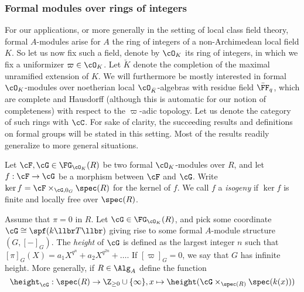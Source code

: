 \documentclass[../main.tex]{subfiles}
\begin{document}

\subsubsection{Formal modules over rings of integers} %
\label{ssub:Formal modules over rings of integers}
For our applications, or more generally in the setting of local class field theory,
formal $A$-modules arise for $A$ the ring of integers of a
non-Archimedean local field $K$. So let us now fix such a field, denote by
$\cO_K$ its ring of integers, in which we fix a uniformizer $\varpi \in \cO_K$. 
Let $\breve K$ denote the completion of the maximal unramified extension of $K$.
We will furthermore be mostly interested in formal $\cO_K$-modules over noetherian local
$\cO_{\breve K}$-algebras with residue field $\bar \FF_q$, which are complete
and Hausdorff (although this is automatic for our notion of completeness) with
respect to the $\varpi$-adic topology. Let us denote the category of such rings
with $\cC$. For sake of clarity, the succeeding results and definitions on
formal groups will be stated in this setting. Most of the results readily
generalize to more general situations.


\begin{defi}[Isogenies]
    Let $\cF, \cG \in \FG_{\cO_K}(R)$ be two formal $\cO_K$-modules over $R$, and 
    let $f: \cF \to \cG$ be a morphism between $\cF$ and $\cG$. Write
    $\ker f = \cF \times_{\cG, 0_G} \spec(R)$ for the kernel of $f$. We call
    $f$ a \emph{isogeny} if $\ker f$ is finite and locally free over $\spec(R)$.
\end{defi}

\begin{defi}
    Assume that $\pi = 0$ in $R$. 
    Let $\cG \in \FG_{\cO_K}(R)$, and pick some coordinate $\cG \cong
    \spf(k\llbr T \llbr)$ giving rise to some formal $A$-module structure $(G,
    [-]_G)$. The \emph{height} of $\cG$ is defined as the largest integer $n$
    such that $[\pi]_G(X) = a_1X^{q^n} + a_2 X^{q^{2n}} + \dots.$ If
    $[\varpi]_G = 0$, we say that $G$ has infinite height. 
    \vspace{6pt}
    More generally, if $R \in \Alg_A$ define the function
    \begin{equation*}
        \height_\cG: \spec(R) \to \Z_{\geq 0} \cup \{\infty\}, 
        x \mapsto \height(\cG \times_{\spec(R)} \spec(k(x)))
    \end{equation*}
\end{defi}
\end{document}
